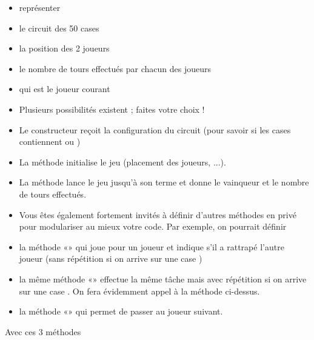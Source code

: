 {
\textstylePolicepardfauti{ }}

\liststyleListi
\begin{itemize}
\item {
représenter}
\item {
le circuit des 50 cases}
\item {
la position des 2 joueurs}
\item {
le nombre de tours effectués par chacun des joueurs}
\item {
qui est le joueur courant}
\item {
Plusieurs possibilités existent ; faites votre choix !}
\item {
Le constructeur reçoit la configuration du circuit (pour savoir si les
cases contiennent  ou
)}
\item {
La méthode  initialise le jeu
(placement des joueurs, ...).}
\item {
La méthode  lance le jeu jusqu’à son terme et
donne le vainqueur et le nombre de tours effectués.}
\item {
Vous êtes également fortement invités à définir d’autres méthodes en
privé pour modulariser au mieux votre code. Par exemple, on pourrait
définir}
\item {
la méthode «» qui joue pour un joueur et
indique s'il a rattrapé l’autre joueur (sans
répétition si on arrive sur une case )}
\item {
la même méthode «» effectue la même tâche
mais avec répétition si on arrive sur une case
. On fera évidemment appel à la méthode
ci-dessus.}
\item {
la méthode «» qui permet de passer au
joueur suivant.}
\end{itemize}
{
Avec ces 3 méthodes}


